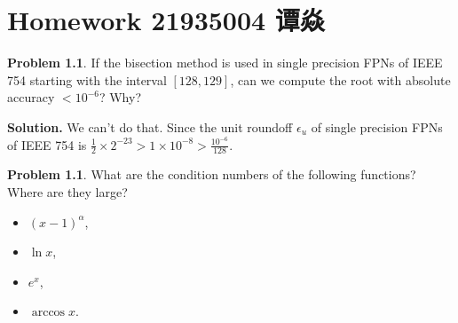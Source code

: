 \documentclass[a4paper]{book}
\makeatletter
\newenvironment{solution}%
{\noindent\textbf{Solution.}}%
{\qedhere}
\newcommand{\voidenvironment}[1]{%
  \expandafter\providecommand\csname env@#1@save@env\endcsname{}%
  \expandafter\providecommand\csname env@#1@process\endcsname{}%
  \@ifundefined{#1}{}{\RenewEnviron{#1}{}}%
}
\numberwithin{equation}{chapter}
\theoremstyle{definition}
\newtheorem{pro}[exm]{Problem}
\makeatother
\begin{document}
\pagestyle{empty}
% 



\setcounter{chapter}{6}




\chapter{Homework 21935004 谭焱}


\begin{pro}
  If the bisection method is used in single precision FPNs of IEEE 754 starting with the interval $[128,129]$, can we compute the root with absolute accuracy $ < 10^{-6}$? Why?
\end{pro}

\begin{solution}
  We can't do that. Since the unit roundoff $\epsilon_u$ of single precision FPNs of IEEE 754 is $\frac{1}{2} \times 2^{-23} > 1 \times 10^{-8} > \frac{10^{-6}}{128}$.
\end{solution}

\begin{pro}
  What are the condition numbers of the following functions? Where are they large?
  \begin{itemize}
  \item $( x - 1)^\alpha$,
  \item $\ln x$,
  \item $ e^x$,
  \item $\arccos x$.
    
  \end{itemize}
\end{pro}
\end{document}
